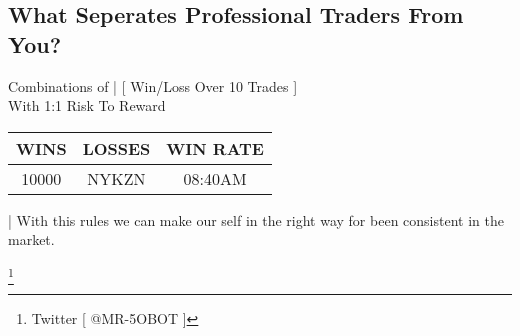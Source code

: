 \documentclass[10pt]{article}
\begin{document}

\renewcommand{\arraystretch}{1.5} %
\setlength{\tabcolsep}{10pt} %

\subsection{What Seperates Professional Traders From You?}
\vspace{0.3cm}
\begin{center}
  \small{Combinations of | [ Win/Loss Over 10 Trades ]} \\
  \small{With 1:1 Risk To Reward}
\end{center}

\begin{center}
\begin{tabular}{|c|c|c|}
  \hline
  WINS & LOSSES & WIN RATE \\ 
  \hline 
  10000 & NYKZN & 08:40AM \\  
  \hline
\end{tabular}
\end{center}
\vspace{0.1cm}


\begin{notesbox}
  \noindent | With this rules we can make our self in the right way for been consistent in the market.
\end{notesbox}


\footnote{Twitter [ @MR-5OBOT ]}
\end{document}
